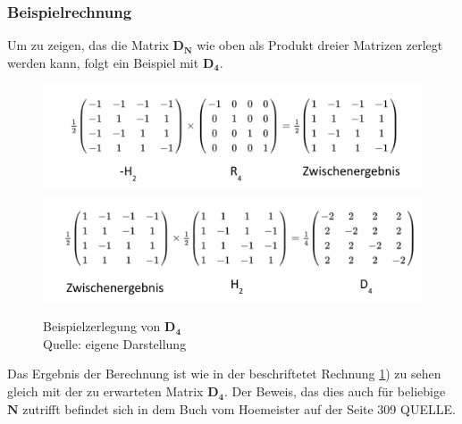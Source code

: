 \subsubsection{Beispielrechnung}
Um zu zeigen, das die Matrix $\mathbf{D_N}$ wie oben als Produkt dreier Matrizen zerlegt werden kann, folgt ein Beispiel mit $\mathbf{D_4}$.
\begin{figure}[hbtp]
	\centering
	\includegraphics[width=.8\textwidth]{figures/householderLokal_1.png}
	\includegraphics[width=.8\textwidth]{figures/householderLokal_2.png}
	\caption{Beispielzerlegung von $\mathbf{D_4}$ \\ Quelle: eigene Darstellung}
	\label{fig:DLokal}
\end{figure}
Das Ergebnis der Berechnung ist wie in der beschriftetet Rechnung \ref{fig:DLokal}) zu sehen gleich mit der zu erwarteten Matrix $\mathbf{D_4}$. Der Beweis, das dies auch für beliebige $\mathbf{N}$ zutrifft befindet sich in dem Buch vom Hoemeister auf der Seite 309 QUELLE.

